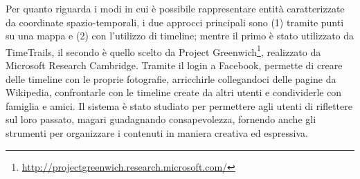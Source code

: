 \documentclass[sigproc-sp.tex]{subfiles}
\begin{document}
Per quanto riguarda i modi in cui è possibile rappresentare entità caratterizzate da coordinate spazio-temporali, i due approcci principali sono (1) tramite punti su una mappa e (2) con l’utilizzo di timeline; mentre il primo è stato utilizzato da TimeTrails, il secondo è quello scelto da Project Greenwich\footnote{\url{http://projectgreenwich.research.microsoft.com/}}, realizzato da Microsoft Research Cambridge. Tramite il login a Facebook, permette di creare delle timeline con le proprie fotografie, arricchirle collegandoci delle pagine da Wikipedia, confrontarle con le timeline create da altri utenti e condividerle con famiglia e amici. Il sistema è stato studiato per permettere agli utenti di riflettere sul loro passato, magari guadagnando consapevolezza, fornendo anche gli strumenti per organizzare i contenuti in maniera creativa ed espressiva.
\end{document}
